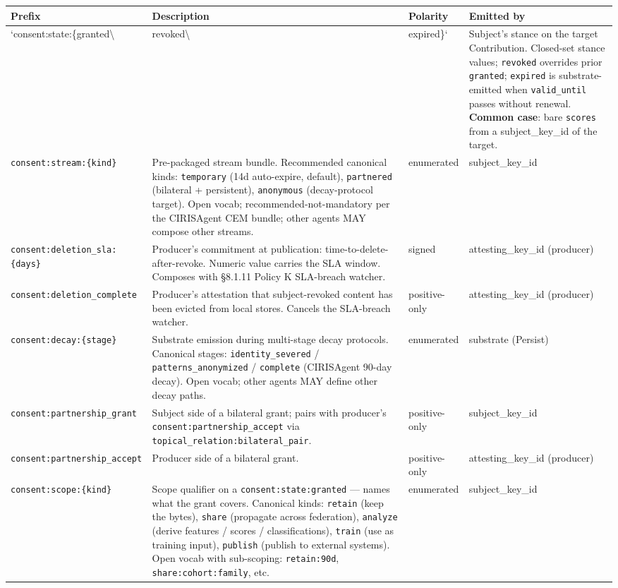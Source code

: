 \documentclass[10pt]{article}
\begin{document}
{\scriptsize
\begin{longtable}{|p{4.0cm}|p{4.0cm}|p{4.0cm}|p{4.0cm}|}\hline
\textbf{Prefix} & \textbf{Description} & \textbf{Polarity} & \textbf{Emitted by} \\ \hline\endhead
`consent:state:\{granted\textbackslash{} & revoked\textbackslash{} & expired\}` & Subject's stance on the target Contribution. Closed-set stance values; \texttt{revoked} overrides prior \texttt{granted}; \texttt{expired} is substrate-emitted when \texttt{valid\_until} passes without renewal. \textbf{Common case}: bare \texttt{scores} from a subject\_key\_id of the target. \\ \hline
\texttt{consent:stream:\{kind\}} & Pre-packaged stream bundle. Recommended canonical kinds: \texttt{temporary} (14d auto-expire, default), \texttt{partnered} (bilateral + persistent), \texttt{anonymous} (decay-protocol target). Open vocab; recommended-not-mandatory per the CIRISAgent CEM bundle; other agents MAY compose other streams. & enumerated & subject\_key\_id \\ \hline
\texttt{consent:deletion\_sla:\{days\}} & Producer's commitment at publication: time-to-delete-after-revoke. Numeric value carries the SLA window. Composes with §8.1.11 Policy K SLA-breach watcher. & signed & attesting\_key\_id (producer) \\ \hline
\texttt{consent:deletion\_complete} & Producer's attestation that subject-revoked content has been evicted from local stores. Cancels the SLA-breach watcher. & positive-only & attesting\_key\_id (producer) \\ \hline
\texttt{consent:decay:\{stage\}} & Substrate emission during multi-stage decay protocols. Canonical stages: \texttt{identity\_severed} / \texttt{patterns\_anonymized} / \texttt{complete} (CIRISAgent 90-day decay). Open vocab; other agents MAY define other decay paths. & enumerated & substrate (Persist) \\ \hline
\texttt{consent:partnership\_grant} & Subject side of a bilateral grant; pairs with producer's \texttt{consent:partnership\_accept} via \texttt{topical\_relation:bilateral\_pair}. & positive-only & subject\_key\_id \\ \hline
\texttt{consent:partnership\_accept} & Producer side of a bilateral grant. & positive-only & attesting\_key\_id (producer) \\ \hline
\texttt{consent:scope:\{kind\}} & Scope qualifier on a \texttt{consent:state:granted} — names what the grant covers. Canonical kinds: \texttt{retain} (keep the bytes), \texttt{share} (propagate across federation), \texttt{analyze} (derive features / scores / classifications), \texttt{train} (use as training input), \texttt{publish} (publish to external systems). Open vocab with sub-scoping: \texttt{retain:90d}, \texttt{share:cohort:family}, etc. & enumerated & subject\_key\_id \\ \hline
\end{longtable}}
\end{document}
